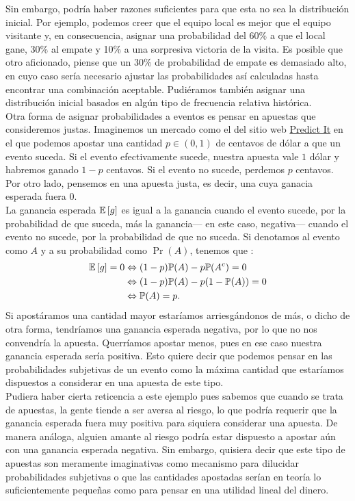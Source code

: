 Sin embargo, podría haber razones suficientes para que esta no sea la distribución inicial. Por ejemplo, podemos creer que el equipo local es mejor que el equipo visitante y, en consecuencia, asignar una probabilidad del  60\% a que el local gane, 30\% al empate y 10\% a una sorpresiva victoria de la visita. Es posible que otro aficionado, piense que un 30\% de probabilidad de empate es demasiado alto, en cuyo caso sería necesario ajustar las probabilidades así calculadas hasta encontrar una combinación aceptable. Pudiéramos también asignar una distribución inicial basados en algún tipo de frecuencia relativa histórica.\\ 

Otra forma de asignar probabilidades a eventos es pensar en apuestas que consideremos justas. Imaginemos un mercado como el del sitio web 	\href{https://www.predictit.org/}{Predict It} en el que podemos apostar una cantidad $p \in (0,1)$ de centavos de dólar a que un evento suceda. Si el evento efectivamente sucede, nuestra apuesta vale $1$ dólar y habremos ganado $1-p$ centavos. Si el evento no sucede, perdemos $p$ centavos. Por otro lado, pensemos en una apuesta justa, es decir, una cuya ganacia esperada fuera $0$.\\ 

La ganancia esperada $\mathbb{E}\left[ g \right]$ es igual a la ganancia cuando el evento sucede, por la probabilidad de que suceda, más la ganancia--- en este caso, negativa--- cuando el evento no sucede, por la probabilidad de que no suceda. Si denotamos al evento como $A$ y a su probabilidad como $\Pr(A)$, tenemos que : 
\begin{align*}
\mathbb{E}\left[ g \right] = 0 &\Leftrightarrow (1-p)\mathbb{P}(A) - p\mathbb{P}(A^c) = 0 \\
&\Leftrightarrow (1-p)\mathbb{P}(A) - p(1-\mathbb{P}(A))= 0\\ 
&\Leftrightarrow \mathbb{P}(A) = p.
\end{align*}
Si apostáramos una cantidad mayor estaríamos arriesgándonos de más, o dicho de otra forma, tendríamos una ganancia esperada negativa, por lo que no nos convendría la apuesta. Querríamos apostar menos, pues en ese caso nuestra ganancia esperada sería positiva. Esto quiere decir que podemos pensar en las probabilidades subjetivas de un evento como la máxima cantidad que estaríamos dispuestos a considerar en una apuesta de este tipo.\\ 

Pudiera haber cierta reticencia a este ejemplo pues sabemos que cuando se trata de apuestas, la gente tiende a ser aversa al riesgo, lo que podría requerir que la ganancia esperada fuera muy positiva para siquiera considerar una apuesta. De manera análoga, alguien amante al riesgo podría estar dispuesto a apostar aún con una ganancia esperada negativa. Sin embargo, quisiera decir que este tipo de apuestas son meramente imaginativas como mecanismo para dilucidar probabilidades subjetivas o que las cantidades apostadas serían en teoría lo suficientemente pequeñas como para pensar en una utilidad lineal del dinero.\\ 

